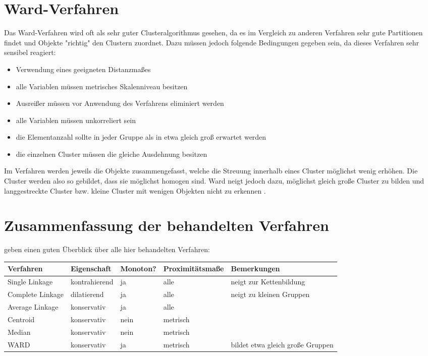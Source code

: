 \section{Ward-Verfahren}
Das Ward-Verfahren wird oft als sehr guter Clusteralgorithmus gesehen, da es im Vergleich zu anderen Verfahren sehr gute Partitionen findet und Objekte "richtig" den Clustern zuordnet. Dazu müssen jedoch folgende Bedingungen gegeben sein, da dieses Verfahren sehr sensibel reagiert: 

\begin{itemize}
	\item Verwendung eines geeigneten Distanzmaßes
	\item alle Variablen müssen metrisches Skalenniveau besitzen
	\item Ausreißer müssen vor Anwendung des Verfahrens eliminiert werden
	\item alle Variablen müssen unkorreliert sein
	\item die Elementanzahl sollte in jeder Gruppe als in etwa gleich groß erwartet werden
	\item die einzelnen Cluster müssen die gleiche Ausdehnung besitzen
\end{itemize}

Im Verfahren werden jeweils die Objekte zusammengefasst, welche die Streuung innerhalb eines Cluster möglichst wenig erhöhen. Die Cluster werden also so gebildet, dass sie möglichst homogen sind. Ward neigt jedoch dazu, möglichst gleich große Cluster zu bilden und langgestreckte Cluster bzw. kleine Cluster mit wenigen Objekten nicht zu erkennen \citep[Vgl.][S. 484]{Backhaus.2016}. \\

\section{Zusammenfassung der behandelten Verfahren}
\citet[S. 489]{Backhaus.2016} geben einen guten Überblick über alle hier behandelten Verfahren: \\
\begin{tabular}{|l|l|l|l|p{3.7cm}|}
	\hline
	\rowcolor{babyblueeyes}Verfahren & Eigenschaft & Monoton? & Proximitätsmaße & Bemerkungen \\ \hline
	\rowcolor{beaublue}Single Linkage & kontrahierend & ja & alle & neigt zur Kettenbildung \\ \hline
	\rowcolor{beaublue}Complete Linkage & dilatierend & ja & alle & neigt zu kleinen Gruppen \\ \hline	
	\rowcolor{beaublue}Average Linkage & konservativ & ja & alle & \\ \hline
	\rowcolor{beaublue}Centroid & konservativ & nein & metrisch & \\ \hline
	\rowcolor{beaublue}Median & konservativ & nein & metrisch & \\ \hline
	\rowcolor{beaublue}WARD & konservativ & ja & metrisch & bildet etwa gleich große Gruppen \\ \hline
\end{tabular}
